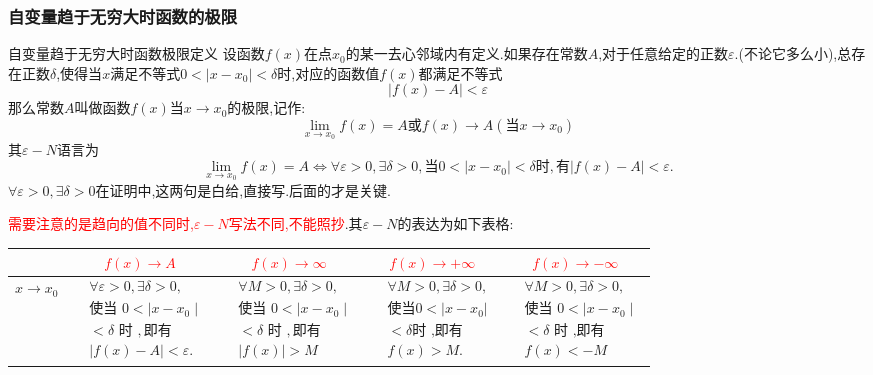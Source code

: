 \documentclass[8pt a4paper, oneside, UTF8]{ctexbook}
\begin{document}
\begin{sloppypar}
    \subsubsection{自变量趋于无穷大时函数的极限}
    \begin{defn}{自变量趋于无穷大时函数极限定义}{}
        设函数$f(x)$在点$x_0$的某一去心邻域内有定义.如果存在常数$A$,对于任意给定的正数$\varepsilon$.(不论它多么小),总存在正数$\delta$,使得当$x$满足不等式$0<|x-x_0|<\delta$时,对应的函数值$f(x)$都满足不等式
        $$
            |f(x)-A|<\varepsilon
        $$
        那么常数$A$叫做函数$f(x)$当$x \to x_0$的极限,记作:
        $$
            \lim_{x\to x_0}f(x)=A\text{或}f(x)\to A(\text{当}x\to x_0)
        $$
        其$\varepsilon-N$语言为
        $$
            \lim\limits_{x\to x_0}f(x)=A\Leftrightarrow\forall\varepsilon>0,\exists\delta>0,\text{当}0<|x-x_0|<\delta\text{时},\text{有}|f(x)-A|<\varepsilon.
        $$
        $\forall\varepsilon>0,\exists\delta>0$在证明中,这两句是白给,直接写.后面的才是关键.
    \end{defn}
    \textcolor{red}{需要注意的是趋向的值不同时,$\varepsilon -N$写法不同,不能照抄}.其$\varepsilon -N$的表达为如下表格:
    \begin{center}
        \begin{tabular}{|c|c|c|c|c|}
            \hline
            & \textcolor{red}{$f(x)\to A$} & \textcolor{red}{$f(x)\to \infty$} & \textcolor{red}{$f(x)\to +\infty$} & \textcolor{red}{$f(x)\to -\infty$}\\
            \hline
            $x \to x_0$       & $\begin{aligned}&\forall\varepsilon>0,\exists\delta>0, \\&\text{使当 }0<\mid x-x_0\mid  \\&<\delta\text{ 时 },\text{即有} \\&|f(x)-A|<\varepsilon.\end{aligned}$ & $\begin{aligned}&\forall M>0,\exists\delta>0, \\&\text{使当 }0<\mid x-x_{0}\mid  \\&<\delta\text{ 时 },\text{即有}\\& |f(x)|>M\end{aligned}$ & $\begin{aligned}&\forall M>0,\exists\delta>0, \\&\text{使当} 0<|x-x_0| \\ &<\delta \text{时 ,即有} \\ &f(x)>M.\end{aligned}$      & $\begin{aligned}&\forall M>0,\exists\delta>0, \\&\text{使当 }0<\mid x-x_{0}\mid  \\&<\delta\text{ 时 ,即有}\\& f(x) <-M\end{aligned}$ \\ \hline

\end{tabular}
\end{center}
\end{sloppypar}
\end{document}
